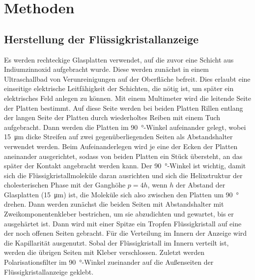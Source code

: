 \documentclass[
	a4paper,
	12pt,
	pagesize,
	ngerman
]{scrartcl}
\begin{document}
	\section{Methoden}
	\subsection{Herstellung der Flüssigkristallanzeige}
	Es werden rechteckige Glasplatten verwendet, auf die zuvor eine Schicht aus Indiumzinnoxid aufgebracht wurde.
	Diese werden zunächst in einem Ultraschallbad von Verunreinigungen auf der Oberfläche befreit. %
	Dies erlaubt eine einseitige elektrische Leitfähigkeit der Schichten, die nötig ist, um später ein elektrisches Feld anlegen zu können. %
	Mit einem Multimeter wird die leitende Seite der Platten bestimmt.
	Auf diese Seite werden bei beiden Platten Rillen entlang der langen Seite der Platten durch wiederholtes Reiben mit einem Tuch aufgebracht.
	Dann werden die Platten im \SI{90}{\degree}-Winkel aufeinander gelegt, wobei \SI{15}{\micro \meter} dicke Streifen auf zwei gegenüberliegenden Seiten als Abstandshalter verwendet werden.
	Beim Aufeinanderlegen wird je eine der Ecken der Platten aneinander ausgerichtet, sodass von beiden Platten ein Stück übersteht, an das später der Kontakt angebracht werden kann.
	Der \SI{90}{\degree}-Winkel ist wichtig, damit sich die Flüssigkristallmoleküle daran ausrichten und sich die Helixstruktur der cholesterischen Phase mit der Ganghöhe $p=4h$, wenn $h$ der Abstand der Glasplatten (\SI{15}{\micro \meter}) ist, die Moleküle sich also zwischen den Platten um \SI{90}{\degree} drehen. %
	Dann werden zunächst die beiden Seiten mit Abstandshalter mit Zweikomponentenkleber bestrichen, um sie abzudichten und gewartet, bis er ausgehärtet ist.
	Dann wird mit einer Spitze ein Tropfen Flüssigkristall auf eine der noch offenen Seiten gebracht. Für die Verteilung im Innern der Anzeige wird die Kapillarität ausgenutzt.
  Sobal der Flüssigkristall im Innern verteilt ist, werden die übrigen Seiten mit Kleber verschlossen.
	Zuletzt werden Polarisationsfilter im \SI{90}{\degree}-Winkel zueinander auf die Außenseiten der Flüssigkristallanzeige geklebt. %
\end{document}
